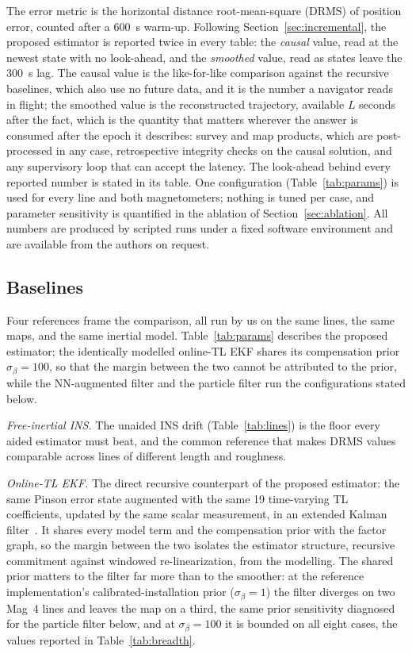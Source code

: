 \documentclass{IEEEtaes}
\begin{document}
The error metric is the horizontal distance root-mean-square (DRMS) of position
error, counted after a \SI{600}{\second} warm-up. Following
Section~\ref{sec:incremental}, the proposed estimator is reported twice in every
table: the \emph{causal} value, read at the newest state with no look-ahead,
and the \emph{smoothed} value, read as states leave the \SI{300}{\second} lag.
The causal value is the like-for-like comparison against the recursive
baselines, which also use no future data, and it is the number a navigator
reads in flight; the smoothed value is the reconstructed trajectory, available
$L$ seconds after the fact, which is the quantity that matters wherever the
answer is consumed after the epoch it describes: survey and map products,
which are post-processed in any case, retrospective integrity checks on the
causal solution, and any supervisory loop that can accept the latency. The
look-ahead behind every reported number is stated in its table. One configuration
(Table~\ref{tab:params}) is used for every line and both magnetometers; nothing
is tuned per case, and parameter sensitivity is quantified in the ablation of
Section~\ref{sec:ablation}. All numbers are produced by scripted runs under a
fixed software environment and are available from the authors on request.

\subsection{Baselines}\label{sec:baselines}
Four references frame the comparison, all run by us on the same lines, the same
maps, and the same inertial model. Table~\ref{tab:params} describes the
proposed estimator; the identically modelled online-TL EKF shares its
compensation prior $\sigma_{\beta}=100$, so that the margin between the two
cannot be attributed to the prior, while the NN-augmented filter and the
particle filter run the configurations stated below.

\emph{Free-inertial INS.} The unaided INS drift (Table~\ref{tab:lines}) is the
floor every aided estimator must beat, and the common reference that makes DRMS
values comparable across lines of different length and roughness.

\emph{Online-TL EKF.} The direct recursive counterpart of the proposed
estimator: the same Pinson error state augmented with the same \num{19}
time-varying TL coefficients, updated by the same scalar measurement, in an
extended Kalman filter~\cite{gnadt2022}. It shares every model term and the
compensation prior with the factor graph, so the margin between the two
isolates the estimator structure, recursive commitment against windowed
re-linearization, from the modelling. The shared prior matters to the filter
far more than to the smoother: at the reference implementation's
calibrated-installation prior ($\sigma_{\beta}=1$) the filter diverges on two
Mag~4 lines and leaves the map on a third, the same prior sensitivity
diagnosed for the particle filter below, and at $\sigma_{\beta}=100$ it is
bounded on all eight cases, the values reported in
Table~\ref{tab:breadth}.
\end{document}
